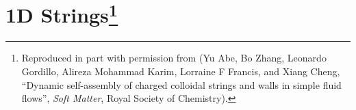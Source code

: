 \chapter[1D Strings]{1D Strings\footnote[1]{
Reproduced in part with permission from (Yu Abe, Bo Zhang, Leonardo Gordillo, Alireza Mohammad Karim, Lorraine F Francis, and Xiang Cheng, ``Dynamic self-assembly of charged colloidal strings and walls in simple fluid flows'', \textit{Soft Matter}, Royal Society of Chemistry).
}}
